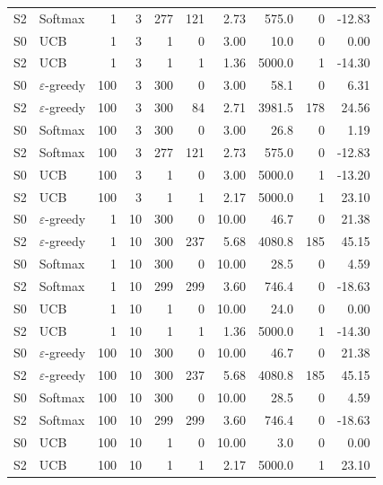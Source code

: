 \begin{longtable}{llrrrrrrrr}
S2 & Softmax & 1 & 3 & 277 & 121 & 2.73 & 575.0 & 0 & -12.83\\
S0 & UCB & 1 & 3 & 1 & 0 & 3.00 & 10.0 & 0 & 0.00\\
S2 & UCB & 1 & 3 & 1 & 1 & 1.36 & 5000.0 & 1 & -14.30\\
S0 & $\varepsilon$-greedy & 100 & 3 & 300 & 0 & 3.00 & 58.1 & 0 & 6.31\\
S2 & $\varepsilon$-greedy & 100 & 3 & 300 & 84 & 2.71 & 3981.5 & 178 & 24.56\\
S0 & Softmax & 100 & 3 & 300 & 0 & 3.00 & 26.8 & 0 & 1.19\\
S2 & Softmax & 100 & 3 & 277 & 121 & 2.73 & 575.0 & 0 & -12.83\\
S0 & UCB & 100 & 3 & 1 & 0 & 3.00 & 5000.0 & 1 & -13.20\\
S2 & UCB & 100 & 3 & 1 & 1 & 2.17 & 5000.0 & 1 & 23.10\\
S0 & $\varepsilon$-greedy & 1 & 10 & 300 & 0 & 10.00 & 46.7 & 0 & 21.38\\
S2 & $\varepsilon$-greedy & 1 & 10 & 300 & 237 & 5.68 & 4080.8 & 185 & 45.15\\
S0 & Softmax & 1 & 10 & 300 & 0 & 10.00 & 28.5 & 0 & 4.59\\
S2 & Softmax & 1 & 10 & 299 & 299 & 3.60 & 746.4 & 0 & -18.63\\
S0 & UCB & 1 & 10 & 1 & 0 & 10.00 & 24.0 & 0 & 0.00\\
S2 & UCB & 1 & 10 & 1 & 1 & 1.36 & 5000.0 & 1 & -14.30\\
S0 & $\varepsilon$-greedy & 100 & 10 & 300 & 0 & 10.00 & 46.7 & 0 & 21.38\\
S2 & $\varepsilon$-greedy & 100 & 10 & 300 & 237 & 5.68 & 4080.8 & 185 & 45.15\\
S0 & Softmax & 100 & 10 & 300 & 0 & 10.00 & 28.5 & 0 & 4.59\\
S2 & Softmax & 100 & 10 & 299 & 299 & 3.60 & 746.4 & 0 & -18.63\\
S0 & UCB & 100 & 10 & 1 & 0 & 10.00 & 3.0 & 0 & 0.00\\
S2 & UCB & 100 & 10 & 1 & 1 & 2.17 & 5000.0 & 1 & 23.10\\
\bottomrule\end{longtable}\endgroup
